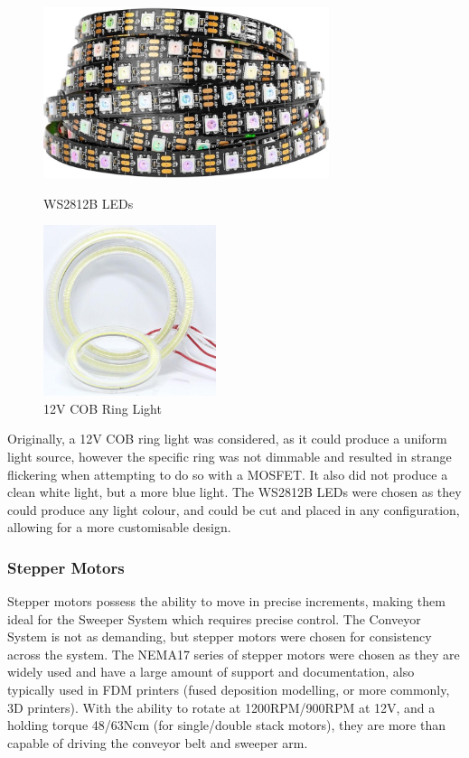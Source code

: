 \begin{figure}[H]
    \hfill
    \begin{minipage}[t]{0.45\textwidth}
      \centering
      \includegraphics[width=\textwidth,height=5cm, keepaspectratio]{imgs/parts/ws2812b.jpg}
        \caption{WS2812B LEDs \cite{ws2812b}}
    \end{minipage}
    \hfill
    \begin{minipage}[t]{0.45\textwidth}
        \centering
        \includegraphics[width=\textwidth,height=5cm, keepaspectratio]{imgs/parts/cob.jpeg}
        \caption{12V COB Ring Light}
      \end{minipage}
      \hfill
\end{figure}

Originally, a 12V COB ring light was considered, as it could produce a uniform light source, however the specific ring was not dimmable and resulted in strange flickering when attempting to do so with a MOSFET. It also did not produce a clean white light, but a more blue light. The WS2812B LEDs were chosen as they could produce any light colour, and could be cut and placed in any configuration, allowing for a more customisable design.

\subsubsection{Stepper Motors}
\label{sec:stepper-motors}
Stepper motors possess the ability to move in precise increments, making them ideal for the Sweeper System which requires precise control. The Conveyor System is not as demanding, but stepper motors were chosen for consistency across the system. The NEMA17 series of stepper motors were chosen \cite{nema17} as they are widely used and have a large amount of support and documentation, also typically used in FDM printers (fused deposition modelling, or more commonly, 3D printers). With the ability to rotate at 1200RPM/900RPM at 12V, and a holding torque 48/63Ncm (for single/double stack motors), they are more than capable of driving the conveyor belt and sweeper arm.

